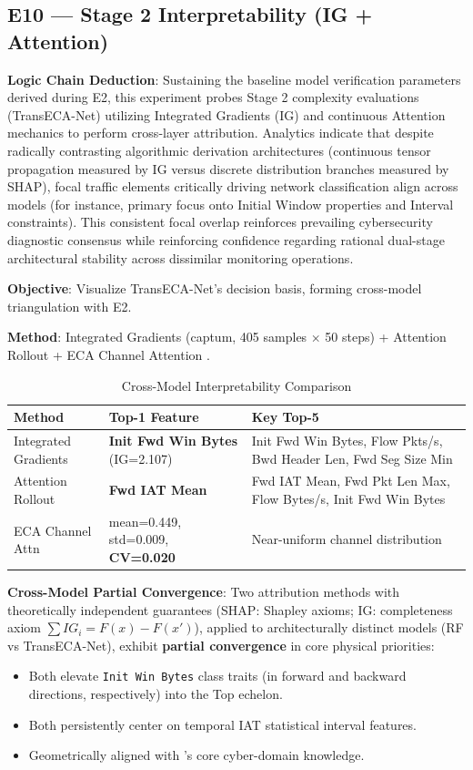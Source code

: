 \documentclass[sigconf]{acmart}
\begin{document}
\subsection{E10 --- Stage 2 Interpretability (IG + Attention)}
\textbf{Logic Chain Deduction}: Sustaining the baseline model verification parameters derived during E2, this experiment probes Stage 2 complexity evaluations (TransECA-Net) utilizing Integrated Gradients (IG) and continuous Attention mechanics to perform cross-layer attribution. Analytics indicate that despite radically contrasting algorithmic derivation architectures (continuous tensor propagation measured by IG versus discrete distribution branches measured by SHAP), focal traffic elements critically driving network classification align across models (for instance, primary focus onto Initial Window properties and Interval constraints). This consistent focal overlap reinforces prevailing cybersecurity diagnostic consensus while reinforcing confidence regarding rational dual-stage architectural stability across dissimilar monitoring operations.

\textbf{Objective}: Visualize TransECA-Net's decision basis, forming cross-model triangulation with E2.

\textbf{Method}: Integrated Gradients (captum, 405 samples $\times$ 50 steps) + Attention Rollout \cite{25} + ECA Channel Attention \cite{23}.

\begin{table}[H]
\caption{Cross-Model Interpretability Comparison}
\label{tab:interpretability_comparison}
\begin{tabular}{lll}
\toprule
\textbf{Method} & \textbf{Top-1 Feature} & \textbf{Key Top-5} \\
\midrule
Integrated Gradients & \textbf{Init Fwd Win Bytes} (IG=2.107) & Init Fwd Win Bytes, Flow Pkts/s, Bwd Header Len, Fwd Seg Size Min \\
Attention Rollout & \textbf{Fwd IAT Mean} & Fwd IAT Mean, Fwd Pkt Len Max, Flow Bytes/s, Init Fwd Win Bytes \\
ECA Channel Attn & mean=0.449, std=0.009, \textbf{CV=0.020} & Near-uniform channel distribution \\
\bottomrule
\end{tabular}
\end{table}

\textbf{Cross-Model Partial Convergence}: Two attribution methods with theoretically independent guarantees (SHAP: Shapley axioms; IG: completeness axiom $\sum IG_i = F(x) - F(x')$), applied to architecturally distinct models (RF vs TransECA-Net), exhibit \textbf{partial convergence} in core physical priorities:
\begin{itemize}
\item Both elevate \texttt{Init Win Bytes} class traits (in forward and backward directions, respectively) into the Top echelon.
\item Both persistently center on temporal IAT statistical interval features.
\item Geometrically aligned with \cite{1}'s core cyber-domain knowledge.
\end{itemize}
\end{document}
